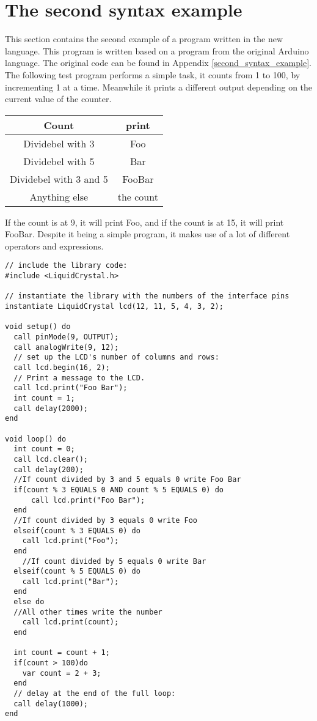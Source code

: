 \section{The second syntax example}
This section contains the second example of a program written in the new language. This program is written based on a program from the original Arduino language. The original code can be found in Appendix \ref{second_syntax_example}. The following test program performs a simple task,
it counts from 1 to 100, by incrementing 1 at a time. Meanwhile it prints a different output depending on the current value of the counter.\\
\begin{table}[H]
\centering
\begin{tabular}{|c|c|}
\hline 
Count & print \\ 
\hline 
Dividebel with 3 & Foo \\ 
\hline 
Dividebel with 5 & Bar \\ 
\hline 
Dividebel with 3 and 5 & FooBar \\ 
\hline 
Anything else & the count \\ 
\hline 
\end{tabular} 
\end{table}

If the count is at 9, it will print Foo, and if the count is at 15, it will print FooBar. Despite it being a simple program, it makes use of a lot of different operators and expressions.

\begin{lstlisting}[caption=LCD code example based on the source language, label=lst:syntax2]
// include the library code:
#include <LiquidCrystal.h>

// instantiate the library with the numbers of the interface pins
instantiate LiquidCrystal lcd(12, 11, 5, 4, 3, 2);

void setup() do
  call pinMode(9, OUTPUT);
  call analogWrite(9, 12);
  // set up the LCD's number of columns and rows: 
  call lcd.begin(16, 2);
  // Print a message to the LCD.
  call lcd.print("Foo Bar");
  int count = 1;
  call delay(2000);
end

void loop() do
  int count = 0;
  call lcd.clear();
  call delay(200);
  //If count divided by 3 and 5 equals 0 write Foo Bar
  if(count % 3 EQUALS 0 AND count % 5 EQUALS 0) do
      call lcd.print("Foo Bar"); 
  end
  //If count divided by 3 equals 0 write Foo 
  elseif(count % 3 EQUALS 0) do
    call lcd.print("Foo");
  end
    //If count divided by 5 equals 0 write Bar 
  elseif(count % 5 EQUALS 0) do
    call lcd.print("Bar");
  end
  else do
  //All other times write the number
    call lcd.print(count);
  end
  
  int count = count + 1;
  if(count > 100)do
    var count = 2 + 3;
  end
  // delay at the end of the full loop:
  call delay(1000);
end
\end{lstlisting}
